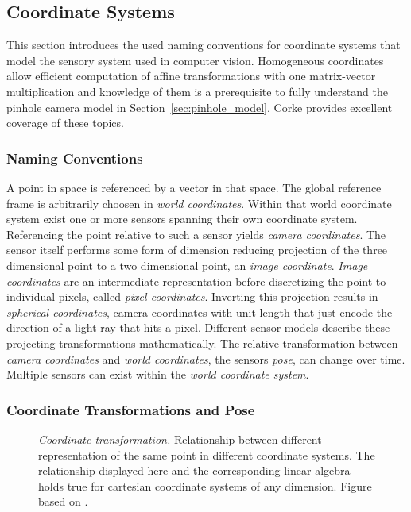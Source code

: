 \subsection{Coordinate Systems}

This section introduces the used naming conventions for coordinate systems that model the sensory system used in computer vision.
Homogeneous coordinates allow efficient computation of affine transformations with one matrix-vector multiplication and knowledge of them is a prerequisite to fully understand the pinhole camera model in Section~\ref{sec:pinhole_model}.
Corke\cite[p. 15-39,533]{corke_2011} provides excellent coverage of these topics.

\subsubsection*{Naming Conventions}

A point in space is referenced by a vector in that space.
The global reference frame is arbitrarily choosen in \emph{world coordinates}.
Within that world coordinate system exist one or more sensors spanning their own coordinate system.
Referencing the point relative to such a sensor yields \emph{camera coordinates}.
The sensor itself performs some form of dimension reducing projection of the three dimensional point to a two dimensional point, an \emph{image coordinate}\cite[p. 251-261]{corke_2011}.
\emph{Image coordinates} are an intermediate representation before discretizing the point to individual pixels, called \emph{pixel coordinates}.
Inverting this projection results in \emph{spherical coordinates}, camera coordinates with unit length that just encode the direction of a light ray that hits a pixel.
Different sensor models describe these projecting transformations mathematically.
The relative transformation between \emph{camera coordinates} and \emph{world coordinates}, the sensors \emph{pose}, can change over time.
Multiple sensors can exist within the \emph{world coordinate system}.

\subsubsection*{Coordinate Transformations and Pose}

\begin{figure}[tb!]
    \scalebox{0.7}{%
    
    }
    \caption[Coordinate transformation]{\emph{Coordinate transformation.} Relationship between different representation of the same point in different coordinate systems. The relationship displayed here and the corresponding linear algebra holds true for cartesian coordinate systems of any dimension. Figure based on \cite[p.20]{corke_2011}.}\label{fig:coordinate_transformation}
\end{figure}

